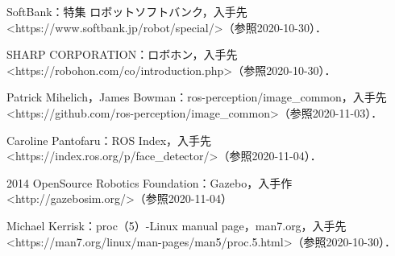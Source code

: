 \documentclass[11pt]{ujarticle} %
\begin{document}
\begin{thebibliography}{99}
  \begin{flushleft}
  SoftBank：特集 \textbar ロボット\textbar ソフトバンク，入手先\textless https://www.softbank.jp/robot/special/\textgreater（参照2020-10-30）．
  \end{flushleft}
  \begin{flushleft}
    SHARP CORPORATION：ロボホン，入手先\textless https://robohon.com/co/introduction.php\textgreater（参照2020-10-30）．
    \end{flushleft}
  \begin{flushleft}
    Patrick Mihelich，James Bowman：ros-perception/image\_common，入手先\textless https://github.com/ros-perception/image\_common\textgreater（参照2020-11-03）．
  \end{flushleft}
  \begin{flushleft}
    Caroline Pantofaru：ROS Index，入手先\textless https://index.ros.org/p/face\_detector/\textgreater（参照2020-11-04）．
  \end{flushleft}
  \begin{flushleft}
  2014 OpenSource Robotics Foundation：Gazebo，入手作\textless http://gazebosim.org/\textgreater（参照2020-11-04）
  \end{flushleft}
  \begin{flushleft}
  Michael Kerrisk：proc（5）-Linux manual page，man7.org，入手先\textless https://man7.org/linux/man-pages/man5/proc.5.html\textgreater（参照2020-10-30）．
  \end{flushleft}
  \begin{flushleft}

\end{flushleft}
\end{thebibliography}
\end{document}
